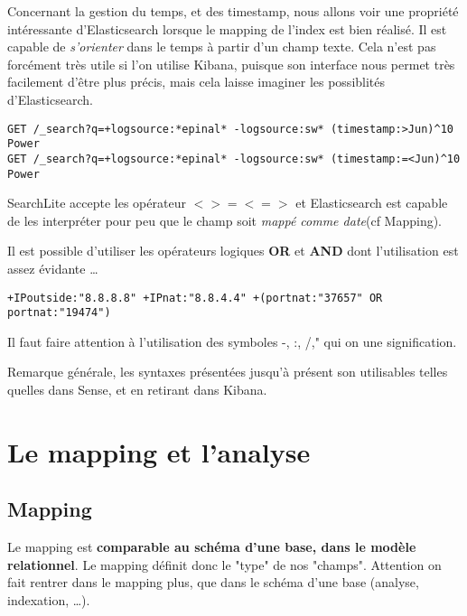 {Concernant la gestion du temps, et des timestamp, nous allons voir une propriété 
intéressante d'Elasticsearch lorsque le mapping de l'index est bien réalisé.
Il est capable de \textit{s'orienter} dans le temps à partir d'un champ texte.
Cela n'est pas forcément très utile si l'on utilise Kibana, puisque son interface
nous permet très facilement d'être plus précis, mais cela laisse imaginer les possiblités
d'Elasticsearch.


\begin{lstlisting}[style=code,label={lst:APIsearchliteexample5},caption={Le temps dans SearchLite}]
GET /_search?q=+logsource:*epinal* -logsource:sw* (timestamp:>Jun)^10 Power
GET /_search?q=+logsource:*epinal* -logsource:sw* (timestamp:=<Jun)^10 Power
\end{lstlisting}

SearchLite accepte les opérateur $< > =< =>$ et Elasticsearch est capable de les 
interpréter pour peu que le champ soit \textit{mappé comme date}(cf Mapping).

Il est possible d'utiliser les opérateurs logiques \textbf{OR} et \textbf{AND} 
dont l'utilisation est assez évidante \ldots
\begin{lstlisting}[style=code,label={lst:APIsearchliteexample6},caption={Opérateurs logiques}]
+IPoutside:"8.8.8.8" +IPnat:"8.8.4.4" +(portnat:"37657" OR portnat:"19474")
\end{lstlisting}

Il faut faire attention à l'utilisation des symboles -, :, /," qui on une signification.


Remarque générale, les syntaxes présentées jusqu'à présent son utilisables telles
quelles dans Sense, et en retirant  dans Kibana.



\section{Le mapping et l'analyse}
\label{sec:mappingetanalys}
\subsection{Mapping}
Le mapping est \textbf{comparable au schéma d'une base, dans le modèle relationnel}.
Le mapping définit donc le "type" de nos "champs". Attention on fait rentrer dans 
le mapping plus, que dans le schéma d'une base (analyse, indexation, \ldots).

}
